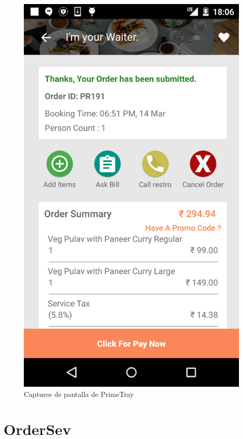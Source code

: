 \begin{figure}[H]
\includegraphics[scale=0.20]{Figures/primetray-3.png}
\caption{Captures de pantalla de PrimeTray}
\end{figure}


\section{OrderSev}

